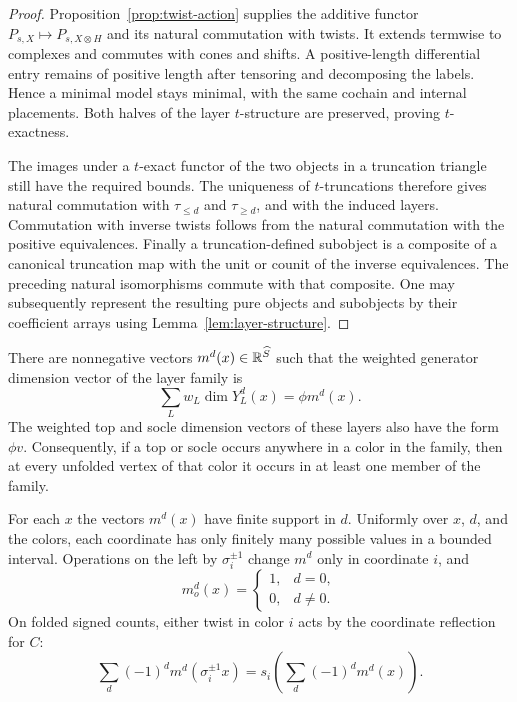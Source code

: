 \begin{proof}
Proposition~\ref{prop:twist-action} supplies the additive
functor $P_{s,X}\mapsto P_{s,X\otimes H}$ and its natural
commutation with twists.  It extends termwise to complexes and
commutes with cones and shifts.  A positive-length differential
entry remains of positive length after tensoring and decomposing
the labels.  Hence a minimal model stays minimal, with the same
cochain and internal placements.  Both halves of the layer
$t$-structure are preserved, proving $t$-exactness.

The images under a $t$-exact functor of the two objects in a
truncation triangle still have the required bounds.  The
uniqueness of $t$-truncations therefore gives natural
commutation with $\tau_{\leq d}$ and $\tau_{\geq d}$, and
with the induced layers.  Commutation with inverse twists
follows from the natural commutation with the positive
equivalences.  Finally a truncation-defined subobject is a
composite of a canonical truncation map with the unit or
counit of the inverse equivalences.  The preceding natural
isomorphisms commute with that composite.  One may subsequently
represent the resulting pure objects and subobjects by their
coefficient arrays using Lemma~\ref{lem:layer-structure}.
\end{proof}

\begin{lemma}
\label{lem:family-proportionality}
There are nonnegative vectors
$m^d(x)\in\mathbb R^{\widehat S}$ such that the weighted generator
dimension vector of the layer family is
\begin{equation}
 \sum_L w_L\dim Y_L^d(x)=\phi m^d(x).
 \label{eq:height-data-proportionality}
\end{equation}
The weighted top and socle dimension vectors of these layers
also have the form $\phi v$.  Consequently, if a top or socle
occurs anywhere in a color in the family, then at every unfolded
vertex of that color it occurs in at least one member of the
family.

For each $x$ the vectors $m^d(x)$ have finite support in $d$.
Uniformly over $x$, $d$, and the colors, each coordinate has
only finitely many possible values in a bounded interval.
Operations on the left by $\sigma_i^{\pm1}$ change $m^d$ only
in coordinate $i$, and
\begin{equation}
 m_o^d(x)=
 \begin{cases}1,&d=0,\\0,&d\ne0.\end{cases}
 \label{eq:height-data-frame-coordinate}
\end{equation}
On folded signed counts, either twist in color $i$ acts by the
coordinate reflection for $C$:
\begin{equation}
 \sum_d(-1)^d m^d(\sigma_i^{\pm1}x)
   =s_i\left(\sum_d(-1)^d m^d(x)\right).
 \label{eq:height-data-signed-reflection}
\end{equation}
\end{lemma}

